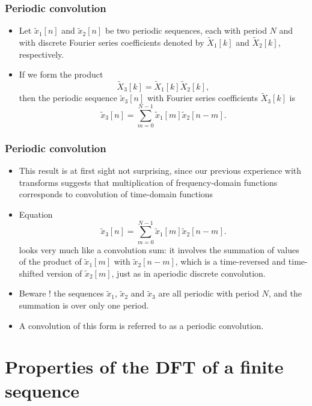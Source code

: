 \begin{frame}
\frametitle{Periodic convolution}
\begin{itemize}
\item Let $\tilde{x}_{1}[n]$ and $\tilde{x}_{2}[n]$ be two periodic sequences, each with period $N$ and with discrete Fourier series coefficients denoted by $\tilde{X}_{1}[k]$ and $\tilde{X}_{2}[k]$, respectively. 
\item If we form the product
$$
\tilde{X}_{3}[k]=\tilde{X}_{1}[k]\tilde{X}_{2}[k],
$$
then the periodic sequence $\tilde{x}_{3}[n]$ with Fourier series coefficients $\tilde{X}_{3}[k]$ is
$$
\tilde{x}_{3}[n]=\sum_{m=0}^{N-1}\tilde{x}_{1}[m]\tilde{x}_{2}[n-m].
$$
\end{itemize}
\end{frame}


\begin{frame}
\frametitle{Periodic convolution}
\begin{itemize}
\item This result is \alert{at first sight} not surprising, since our previous experience with transforms suggests that multiplication of frequency-domain functions corresponds to convolution of time-domain functions
\item  Equation
$$
\tilde{x}_{3}[n]=\sum_{m=0}^{N-1}\tilde{x}_{1}[m]\tilde{x}_{2}[n-m].
$$
looks very much like a convolution sum: it involves the summation of values of the product of $\tilde{x}_{1}[m]$ with $\tilde{x}_{2}[n-m]$, which is a time-reversed and time-shifted version of $\tilde{x}_{2}[m]$, just as in aperiodic discrete convolution.
\item \alert{Beware !} the sequences $\tilde{x}_1$, $\tilde{x}_2$ and $\tilde{x}_3$ are all periodic with period $N$, and \alert{the summation is over only one period}. 
\item A convolution of this form  is referred to as a \alert{periodic convolution}.
\end{itemize}
\end{frame}

\section{Properties of the DFT of a finite sequence}

